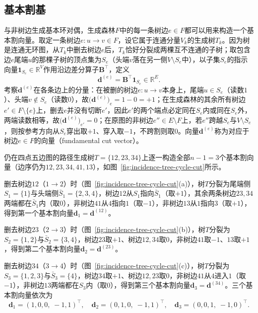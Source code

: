 \subsection{基本割基}
\label{sec:incidence-fundamental-cut-bases}

与非树边生成基本环对偶，生成森林$F$中的每一条树边$e\in F$都可以用来构造一个基本割向量。取定一条树边$e\colon u\to v\in F$，设它属于连通分量$V_k$的生成树$T_k$。因为树是连通无环图，从$T_k$中删去树边$e$后，$T_k$恰好分裂成两棵互不连通的子树；取包含边$e$尾端$u$的那棵子树的顶点集为$S_e$（头端$v$落在另一侧$V\setminus S_e$中），以子集$S_e$的指示向量$\bm{1}_{S_e}\in\mathbb{R}^V$作用沿边差分算子$\bm{B}^\top$，定义
\[
\bm{d}^{(e)}=\bm{B}^\top\bm{1}_{S_e}\in\mathbb{R}^E.
\]
考察$\bm{d}^{(e)}$在各条边上的分量：在被删的树边$e\colon u\to v$本身上，尾端$u\in S_e$（读数$1$）、头端$v\notin S_e$（读数$0$），故$\bigl(\bm{d}^{(e)}\bigr)_e=1-0=+1$；在生成森林的其余所有树边$e'\in F\setminus\{e\}$上，删去$e$并没有切断$e'$，因此$e'$的两个端点必定同在$S_e$内或同在$S_e$外，两端读数相等，故$\bigl(\bm{d}^{(e)}\bigr)_{e'}=0$；在原图的非树边$e''\in E\setminus F$上，若$e''$跨越$S_e$与$V\setminus S_e$，则按参考方向从$S_e$穿出取$+1$、穿入取$-1$，不跨割则取$0$。向量$\bm{d}^{(e)}$称为对应于树边$e\in F$的向量（fundamental cut vector）。

仍在四点五边图的路径生成树$T=\{12,23,34\}$上逐一构造全部$n-1=3$个基本割向量（边序仍为$12,23,34,41,13$），如图~\ref{fig:incidence-tree-cycle-cut}所示。

删去树边$12$（$1\to2$）时（图~\ref{fig:incidence-tree-cycle-cut}(a)），树$T$分裂为尾端侧$S_1=\{1\}$与头端侧$\bar{S}_1=\{2,3,4\}$，树边$12$从$S_1$指向$\bar{S}_1$（取$+1$），其余两条树边$23,34$两端都在$\bar{S}_1$内（取$0$），非树边$41$从$4$指向$1$（取$-1$），非树边$13$从$1$指向$3$（取$+1$），得到第一个基本割向量$\bm{d}_1=\bm{d}^{(12)}$。

删去树边$23$（$2\to3$）时（图~\ref{fig:incidence-tree-cycle-cut}(b)），树$T$分裂为$S_2=\{1,2\}$与$\bar{S}_2=\{3,4\}$，树边$23$取$+1$、树边$12,34$取$0$，非树边$41$取$-1$、$13$取$+1$，得到第二个基本割向量$\bm{d}_2=\bm{d}^{(23)}$。

删去树边$34$（$3\to4$）时（图~\ref{fig:incidence-tree-cycle-cut}(c)），树$T$分裂为$S_3=\{1,2,3\}$与$\bar{S}_3=\{4\}$，树边$34$取$+1$、树边$12,23$取$0$，非树边$41$从$4$进入$1$（取$-1$），非树边$13$两端都在$S_3$内（取$0$），得到第三个基本割向量$\bm{d}_3=\bm{d}^{(34)}$。三个基本割向量依次为
\[
\bm{d}_1=(1,0,0,\;-1,1)^\top,\quad
\bm{d}_2=(0,1,0,\;-1,1)^\top,\quad
\bm{d}_3=(0,0,1,\;-1,0)^\top.
\]

